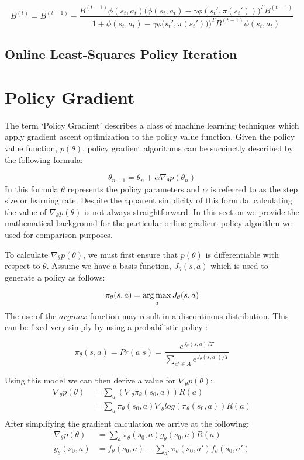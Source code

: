\[
    B^{(t)} = B^{(t-1)} - \frac{B^{(t-1)}\phi(s_t,a_t)\big(\phi(s_t,a_t) - \gamma\phi(s_t',\pi(s_t'))\big)^TB^{(t-1)}}{1 + \phi(s_t,a_t) - \gamma\phi\big(s_t',\pi(s_t'))\big)^TB^{(t-1)}\phi(s_t,a_t)}
\]

\subsection{Online Least-Squares Policy Iteration}

\section{Policy Gradient}

The term `Policy Gradient' describes a class of machine learning techniques which apply gradient ascent optimization to the policy value function. Given the policy value function, $p(\theta)$, policy gradient algorithms can be succinctly described by the following formula:

\[
    \theta_{n+1} = \theta_{n} + \alpha\nabla_\theta p(\theta_{n})
\]
In this formula $\theta$ represents the policy parameters and $\alpha$ is referred to as the step size or learning rate. \cite{norvig}\cite{bishop} Despite the apparent simplicity of this formula, calculating the value of $\nabla_\theta p(\theta)$ is not always straightforward. In this section we provide the mathematical background for the particular online gradient policy algorithm we used for comparison purposes.

To calculate $\nabla_\theta p(\theta)$, we must first ensure that $p(\theta)$ is differentiable with respect to $\theta$. Assume we have a basis function, $J_\theta(s,a)$ which is used to generate a policy as follows:

\[
    \pi_\theta(s,a) = \operatorname*{arg\,max}_a J_\theta(s,a)
\]
The use of the $argmax$ function may result in a discontinous distribution. This can be fixed very simply by using a probabilistic policy \cite{olpomdp:lecture}:

\[
    \pi_\theta(s,a) = Pr(a|s) = \frac{e^{J_\theta(s,a)/T}}{\sum\limits_{a'\in A} e^{J_\theta(s,a')/T}}
\]

Using this model we can then derive a value for $\nabla_\theta p(\theta)$:
\[
    \begin{aligned}
        \nabla_\theta p(\theta) &= \sum_a (\nabla_\theta\pi_\theta(s_0,a))R(a) \\
        &= \sum_a \pi_\theta(s_0, a) \nabla_\theta log(\pi_\theta(s_0, a))R(a) \\
    \end{aligned}
\]
After simplifying the gradient calculation we arrive at the following:
\[
    \begin{aligned}
        \nabla_\theta p(\theta) &= \sum_a\pi_\theta(s_0,a)g_\theta(s_0,a)R(a) \\
        g_\theta(s_0,a) &= f_\theta(s_0, a) - \sum\limits_{a'} \pi_\theta(s_0,a')f_\theta(s_0,a')
    \end{aligned}
\]

